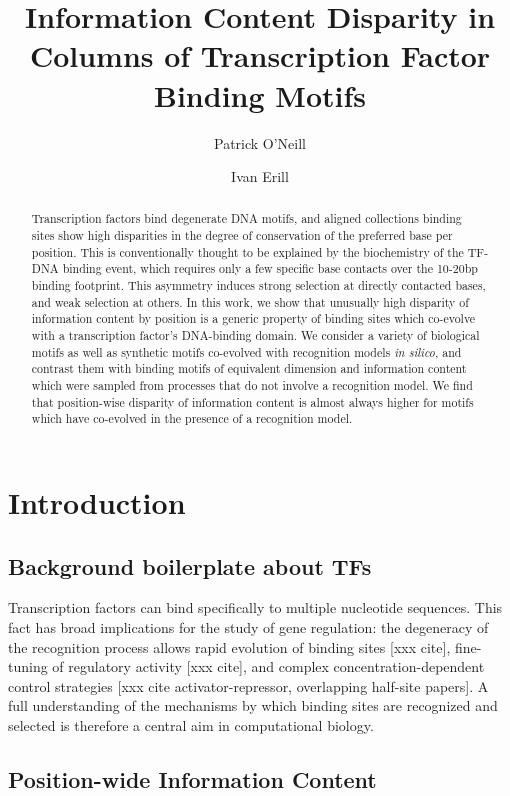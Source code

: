 \documentclass{article}
\title{Information Content Disparity in Columns of Transcription Factor Binding Motifs}
\author[1]{Patrick O'Neill}
\author[1]{Ivan Erill}
\affil[1]{Department of Biological Sciences, UMBC}
\begin{document}
\maketitle{}
\begin{abstract}
  Transcription factors bind degenerate DNA motifs, and
  aligned collections binding sites show high disparities in the
  degree of conservation of the preferred base per position.  This is
  conventionally thought to be explained by the biochemistry of the
  TF-DNA binding event, which requires only a few specific base
  contacts over the 10-20bp binding footprint.  This asymmetry induces
  strong selection at directly contacted bases, and weak selection at
  others.  In this work, we show that unusually high disparity of
  information content by position is a generic property of binding
  sites which co-evolve with a transcription factor's DNA-binding
  domain.  We consider a variety of biological motifs as well as
  synthetic motifs co-evolved with recognition models \textit{in
    silico}, and contrast them with binding motifs of equivalent
  dimension and information content which were sampled from processes
  that do not involve a recognition model.  We find that position-wise
  disparity of information content is almost always higher for motifs
  which have co-evolved in the presence of a recognition model.
\end{abstract}
\section{Introduction}
\subsection{Background boilerplate about TFs}
Transcription factors can bind specifically to multiple nucleotide
sequences.  This fact has broad implications for the study of gene
regulation: the degeneracy of the recognition process allows rapid
evolution of binding sites [xxx cite], fine-tuning of regulatory
activity [xxx cite], and complex concentration-dependent control
strategies [xxx cite activator-repressor, overlapping half-site
papers].  A full understanding of the mechanisms by which binding
sites are recognized and selected is therefore a central aim in
computational biology.

\subsection{Position-wide Information Content}
\end{document}
